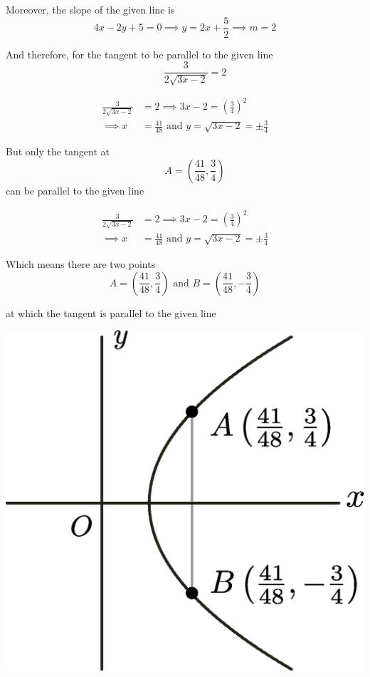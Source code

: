 \documentclass[14pt,fleqn]{extarticle}
\begin{document}
Moreover, the slope of the given line is 
\[ 4x-2y + 5 = 0 \implies y = 2x + \frac{5}{2} \implies m = 2 \]

And therefore, for the tangent to be parallel to the given line
\[ \qquad \frac{3}{2\sqrt{3x-2}} = 2 \]

\newcard 

\begin{align}
	\frac{3}{2\sqrt{3x-2}} &= 2 \implies 3x - 2 = \left(\frac{3}{4} \right)^2  \\
	\implies x &= \frac{41}{48} \text{ and } y = \sqrt{3x-2} = \pm \frac{3}{4} 
\end{align}

But only the tangent at  
\[ \qquad A = \left(\frac{41}{48}, \frac{3}{4} \right)\]
can be parallel to the given line 

\newcard 

\begin{align}
	\frac{3}{2\sqrt{3x-2}} &= 2 \implies 3x - 2 = \left(\frac{3}{4} \right)^2  \\
	\implies x &= \frac{41}{48} \text{ and } y = \sqrt{3x-2} = \pm \frac{3}{4} 
\end{align}

Which means there are two points 
\[ A = \left(\frac{41}{48}, \frac{3}{4} \right) \text{ and } B = \left(\frac{41}{48}, -\frac{3}{4} \right)\]

at which the tangent is parallel to the given line 

\newcard 

\begin{center}
\includegraphics[scale=0.3]{rs-2.eps} 
\end{center} 
\end{document}
